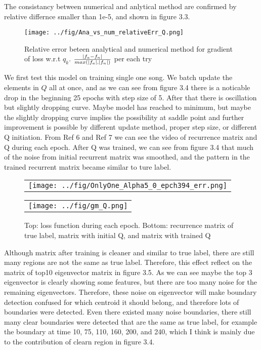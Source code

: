 \documentclass[final]{siamltexmm}
\begin{document}
The consistancy between numerical and anlytical method are confirmed by relative differnce smaller than 1e-5, and shown in figure 3.3.
\begin{figure}[H]
  \centering
    \texttt{[image: ../fig/Ana\_vs\_num\_relativeErr\_Q.png]}
  \caption{Relative error beteen analytical and numerical method for gradient of loss w.r.t $q_k$. $|f_a - f_n| \over max(|f_a|, |f_n|)$ per each try}
\end{figure}
We first test this model on training single one song. We batch update the elements in $Q$ all at once, and as we can see from figure 3.4 there is a noticable drop in the beginning 25 epochs with step size of 5. After that there is oscillation but slightly dropping curve. Maybe model has reached to minimum, but maybe the slightly dropping curve implies the possibility at saddle point and further improvement is possible by different update method, proper step size, or different Q initiation. From Ref 6 and Ref 7 we can see the video of recurrence matrix and Q during each epoch. After Q was trained, we can see from figure 3.4 that much of the noise from initial recurrent matrix was smoothed, and the pattern in the trained recurrent matrix became similar to ture label.
\begin{figure}[H]
\centering
\begin{subfigure}
  \begin{tabular}{c}
  \texttt{[image: ../fig/OnlyOne\_Alpha5\_0\_epch394\_err.png]}
  \end{tabular}{}
\end{subfigure}
  \begin{tabular}{c}
  \texttt{[image: ../fig/gm\_Q.png]}
  \end{tabular}{}
\begin{subfigure}
\end{subfigure}
\caption{Top: loss function during each epoch. Bottom: recurrence matrix of true label, matrix with initial Q, and matrix with trained Q}
\end{figure}
Although matrix after training is cleaner and similar to true label, there are still many regions are not the same as true label. Therefore, this effect reflect on the matrix of top10 eigenvector matrix in figure 3.5. As we can see maybe the top 3 eigenvector is clearly showing some features, but there are too many noise for the remaining eigenvectors. Therefore, these noise on eigenvector will make boundary detection confused for which centroid it should belong, and therefore lots of boundaries were detected. Even there existed many noise boundaries, there still many clear boundaries were detected that are the same as true label, for example the boundary at time 10, 75, 110, 160, 200, and 240, which I think is mainly due to the contribution of clearn region in figure 3.4.
\end{document}
